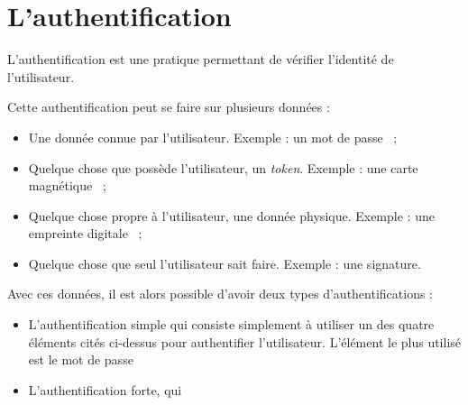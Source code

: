 \section{L'authentification}
L'authentification est une pratique permettant de vérifier
l'identité de l'utilisateur.

Cette authentification peut se faire sur plusieurs données : 
\begin{itemize}
  \item Une donnée connue par l'utilisateur. Exemple : un mot de
passe ~;
  \item Quelque chose que possède l'utilisateur, un \emph{token}.
Exemple : une carte magnétique ~;
  \item Quelque chose propre à l'utilisateur, une donnée physique.
Exemple : une empreinte digitale ~;
  \item Quelque chose que seul l'utilisateur sait faire. Exemple :
une signature.
\end{itemize}

Avec ces données, il est alors possible d'avoir deux types
d'authentifications : 
\begin{itemize}
  \item L'authentification simple qui consiste simplement à
utiliser un des quatre éléments cités ci-dessus pour authentifier
l'utilisateur. L'élément le plus utilisé est le mot de passe
  \item L'authentification forte, qui 

\end{itemize}

